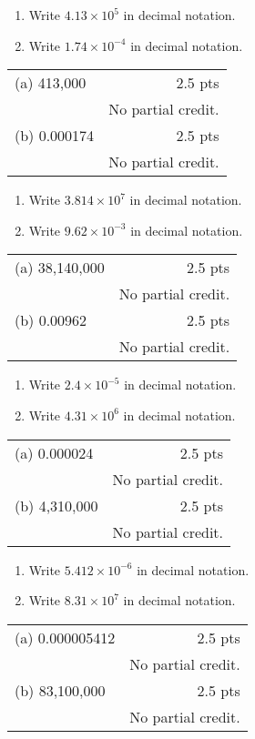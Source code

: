 {
	\begin{enumerate}
	\item Write $4.13\times 10^{5}$ in decimal notation.
	\begin{onlyproblem}\spc\end{onlyproblem}
	\item Write $1.74\times 10^{-4}$ in decimal notation.
	\end{enumerate}
}
{
	\begin{tabular}{l r}
	(a) 413,000 &  2.5 pts\\
	& No partial credit.\\
	(b) 0.000174 & 2.5 pts\\
	& No partial credit.
	\end{tabular}
}

{
	\begin{enumerate}
	\item Write $3.814\times 10^{7}$ in decimal notation.
	\begin{onlyproblem}\spc\end{onlyproblem}
	\item Write $9.62\times 10^{-3}$ in decimal notation.
	\end{enumerate}
}
{
	\begin{tabular}{l r}
	(a) 38,140,000 &  2.5 pts\\
	& No partial credit.\\
	(b) 0.00962 & 2.5 pts\\
	& No partial credit.
	\end{tabular}
}

{
	\begin{enumerate}
	\item Write $2.4\times 10^{-5}$ in decimal notation.
	\begin{onlyproblem}\spc\end{onlyproblem}
	\item Write $4.31\times 10^{6}$ in decimal notation.
	\end{enumerate}
}
{
	\begin{tabular}{l r}
	(a) 0.000024 &  2.5 pts\\
	& No partial credit.\\
	(b) 4,310,000 & 2.5 pts\\
	& No partial credit.
	\end{tabular}
}

{
	\begin{enumerate}
	\item Write $5.412\times 10^{-6}$ in decimal notation.
	\begin{onlyproblem}\spc\end{onlyproblem}
	\item Write $8.31\times 10^{7}$ in decimal notation.
	\end{enumerate}
}
{
	\begin{tabular}{l r}
	(a) 0.000005412&  2.5 pts\\
	& No partial credit.\\
	(b) 83,100,000 & 2.5 pts\\
	& No partial credit.
	\end{tabular}
}
